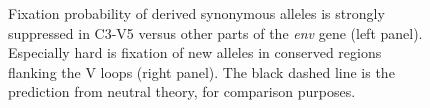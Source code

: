\documentclass[12pt,a4paper,notitlepage,onecolumn]{article}
\begin{document}
\begin{figure}
\begin{center}
\caption{Fixation probability of derived synonymous alleles is strongly
suppressed in C3-V5 versus other parts of the {\it env} gene (left panel).
Especially hard is fixation of new alleles in conserved regions flanking the V
loops (right panel). The black dashed line is the prediction from neutral
theory, for comparison purposes.}
\end{center}
\end{figure}
\end{document}
